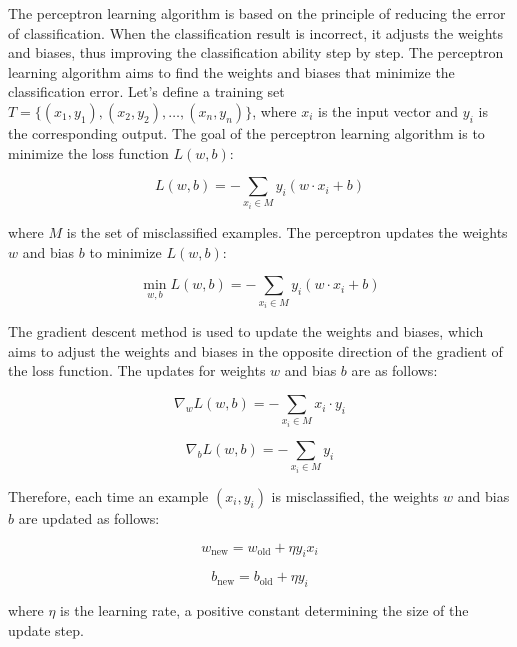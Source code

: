 \documentclass[paper=a4, fontsize=11pt]{scrartcl} %
\numberwithin{equation}{section} %
\numberwithin{figure}{section} %
\numberwithin{table}{section} %
\begin{document}
The perceptron learning algorithm is based on the principle of reducing the error of classification. When the classification result is incorrect, it adjusts the weights and biases, thus improving the classification ability step by step. The perceptron learning algorithm aims to find the weights and biases that minimize the classification error. Let's define a training set \( T = \{(x_1, y_1), (x_2, y_2), \ldots, (x_n, y_n)\} \), where \( x_i \) is the input vector and \( y_i \) is the corresponding output. The goal of the perceptron learning algorithm is to minimize the loss function \( L(w,b) \):

\begin{equation}
L(w,b) = - \sum_{x_i \in M} y_i (w \cdot x_i + b)
\end{equation}

where \( M \) is the set of misclassified examples. The perceptron updates the weights \( w \) and bias \( b \) to minimize \( L(w,b) \):

\begin{equation}
\min_{w,b} L(w,b) = - \sum_{x_i \in M} y_i (w \cdot x_i + b)
\end{equation}

The gradient descent method is used to update the weights and biases, which aims to adjust the weights and biases in the opposite direction of the gradient of the loss function. The updates for weights \( w \) and bias \( b \) are as follows:

\begin{equation}
\nabla_w L(w,b) = - \sum_{x_i \in M} x_i \cdot y_i
\end{equation}

\begin{equation}
\nabla_b L(w,b) = - \sum_{x_i \in M} y_i
\end{equation}

Therefore, each time an example \( (x_i, y_i) \) is misclassified, the weights \( w \) and bias \( b \) are updated as follows:

\begin{equation}
w_{\text{new}} = w_{\text{old}} + \eta y_i x_i
\end{equation}

\begin{equation}
b_{\text{new}} = b_{\text{old}} + \eta y_i
\end{equation}

where \( \eta \) is the learning rate, a positive constant determining the size of the update step.
\end{document}
